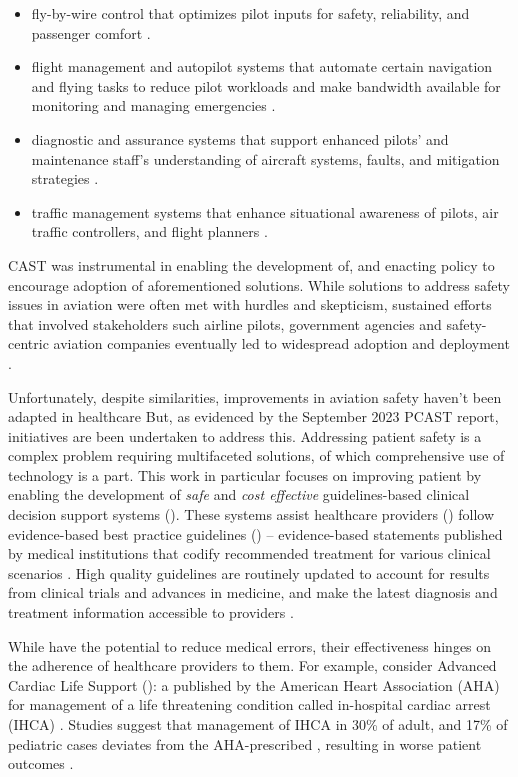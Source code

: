 \begin{itemize}
  \item fly-by-wire control that optimizes pilot inputs for safety, reliability,
    and passenger comfort \cite{FBWSkybraryUrl}.
  \item flight management and autopilot systems that automate certain navigation
    and flying tasks to reduce pilot workloads and make bandwidth available for monitoring and
    managing emergencies \cite{CockpitAutomationSkybraryURL}.
  \item diagnostic and assurance systems that support enhanced pilots' and
    maintenance staff's understanding of aircraft systems, faults, and
    mitigation strategies \cite{CockpitAutomationSkybraryURL}.
  \item traffic management systems that enhance situational awareness of
    pilots, air traffic controllers, and flight planners \cite{ATMSkybraryUrl,TCASUrl}.
\end{itemize}
CAST was instrumental in enabling the development of, and enacting policy to
encourage adoption of aforementioned solutions.
While solutions to address safety issues in aviation were often met with
hurdles and skepticism, sustained efforts that involved stakeholders such
airline pilots, government agencies and safety-centric aviation companies
eventually led to widespread adoption and deployment \cite{CASTSafetySkybrary}.

Unfortunately, despite similarities, improvements in aviation safety haven't been adapted in healthcare \cite{GerstleJPS18}
But, as evidenced by the September 2023 PCAST report, initiatives are been
undertaken to address this. Addressing patient safety is a complex problem
requiring multifaceted solutions, of which comprehensive use of technology is a part.
This work in particular focuses on improving patient by enabling
the development of \emph{safe} and \emph{cost effective} guidelines-based clinical decision
support systems (\CDSSs{}). These systems assist healthcare providers (\HCPs{}) follow
evidence-based best practice guidelines (\BPGs{}) -- evidence-based
statements published by medical institutions that codify recommended treatment
for various clinical scenarios \cite{FieldClinical90}. High quality guidelines are routinely updated to account for
 results from clinical trials and advances in medicine, and make the latest
 diagnosis and treatment information accessible to providers \cite{SteinbergNAP11}.

While \BPGs{} have the potential to reduce medical errors, their effectiveness hinges
on the adherence of healthcare providers to them.
For example, consider Advanced Cardiac Life Support (\ACLS{}): a \BPG{} published
by the American Heart Association (AHA) for management
of a life threatening condition called in-hospital cardiac arrest (IHCA) \cite{AHAGuidelineAdult, AHAGuidelinePed}. Studies suggest that management
of IHCA in 30\% of adult, and 17\% of pediatric cases deviates from the
AHA-prescribed \BPG, resulting in worse patient outcomes \cite{Ornato2012DeviationAdult,Wolfe2020DeviationPediatric,
Crowley2020DeviationAdult,Honarmand2018Adherence,Mcevoy2014Adherence}.

